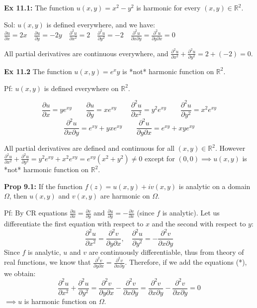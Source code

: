 \documentclass{article}
\begin{document}
\textbf{Ex 11.1:} The function $u(x,y) = x^2 - y^2$ is harmonic for every $(x,y) \in \mathbb{R}^2$.

Sol: $u(x,y)$ is defined everywhere, and we have:
$\frac{\partial u}{\partial x} = 2x \quad \frac{\partial u}{\partial y} = -2y \quad \frac{\partial^2 u}{\partial x^2} = 2 \quad \frac{\partial^2 u}{\partial y^2} = -2 \quad \frac{\partial^2 u}{\partial x \partial y} = \frac{\partial^2 u}{\partial y \partial x} = 0$

All partial derivatives are continuous everywhere, and $\frac{\partial^2 u}{\partial x^2} + \frac{\partial^2 u}{\partial y^2} = 2 + (-2) = 0$.

\textbf{Ex 11.2} The function $u(x,y) = e^x y$ is *not* harmonic function on $\mathbb{R}^2$.

Pf: $u(x,y)$ is defined everywhere on $\mathbb{R}^2$.

$$ \frac{\partial u}{\partial x} = ye^{xy} \qquad \frac{\partial u}{\partial y} = xe^{xy} \qquad \frac{\partial^2 u}{\partial x^2} = y^2e^{xy} \qquad \frac{\partial^2 u}{\partial y^2} = x^2e^{xy} $$
$$ \frac{\partial^2 u}{\partial x \partial y} = e^{xy} + yxe^{xy} \qquad \frac{\partial^2 u}{\partial y \partial x} = e^{xy} + xye^{xy} $$

All partial derivatives are defined and continuous for all $(x,y) \in \mathbb{R}^2$. However $\frac{\partial^2 u}{\partial x^2} + \frac{\partial^2 u}{\partial y^2} = y^2e^{xy} + x^2e^{xy} = e^{xy}(x^2 + y^2) \neq 0$ except for $(0,0) \implies u(x,y)$ is *not* harmonic function on $\mathbb{R}^2$.

\textbf{Prop 9.1:} If the function $f(z) = u(x,y) + iv(x,y)$ is analytic on a domain $\Omega$, then $u(x,y)$ and $v(x,y)$ are harmonic on $\Omega$.

Pf: By CR equations $\frac{\partial u}{\partial x} = \frac{\partial v}{\partial y}$ and $\frac{\partial u}{\partial y} = -\frac{\partial v}{\partial x}$ (since $f$ is analytic). Let us differentiate the first equation with respect to $x$ and the second with respect to $y$:
$$ \frac{\partial^2 u}{\partial x^2} = \frac{\partial^2 v}{\partial y \partial x}, \quad \frac{\partial^2 u}{\partial y^2} = -\frac{\partial^2 v}{\partial x \partial y} $$
Since $f$ is analytic, $u$ and $v$ are continuously differentiable, thus from theory of real functions, we know that $\frac{\partial^2 v}{\partial y \partial x} = \frac{\partial^2 v}{\partial x \partial y}$. Therefore, if we add the equations (*), we obtain:
$$ \frac{\partial^2 u}{\partial x^2} + \frac{\partial^2 u}{\partial y^2} = \frac{\partial^2 v}{\partial y \partial x} - \frac{\partial^2 v}{\partial x \partial y} = \frac{\partial^2 v}{\partial x \partial y} - \frac{\partial^2 v}{\partial x \partial y} = 0 $$
$\implies u$ is harmonic function on $\Omega$.
\end{document}
